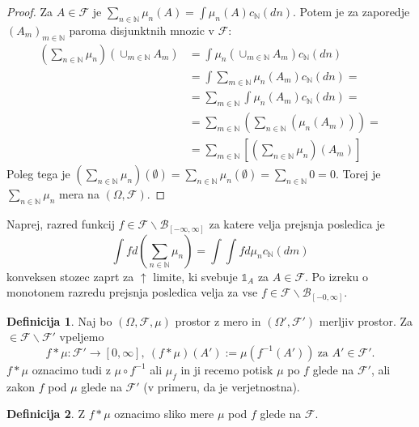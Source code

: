 \documentclass[a4paper,12pt]{article}
\theoremstyle{definition} %
\newtheorem{definicija}{Definicija}[section]
\theoremstyle{plain} %
\newcommand{\N}{\mathbb{N}}
\newcommand{\F}{\mathcal{F}}
\begin{document}
            \begin{proof}
                Za $A \in \F$ je $\sum_{n \in \N}\mu_n(A) = \int \mu_n(A)c_\N(dn)$. Potem je za zaporedje $(A_m)_{m \in \N}$
                paroma disjunktnih mnozic v $\F$:
                \begin{align*}
                    \left( \sum_{n \in \N}\mu_n \right)\left(\cup_{m \in \N}A_m\right) &= \int \mu_n \left(\cup_{m \in \N}A_m\right)c_\N(dn) \\
                    &= \int \sum_{m \in \N}\mu_n(A_m)c_\N(dn) = \\
                    &= \sum_{m \in \N} \int \mu_n(A_m)c_\N(dn) = \\
                    &= \sum_{m \in \N}\left(\sum_{n\in \N}(\mu_n(A_m))\right) = \\
                    &= \sum_{m \in \N}\left[\left(\sum_{n\in\N}\mu_n\right)(A_m)\right]                    
                \end{align*}
                Poleg tega je
                $\left(\sum_{n\in\N}\mu_n\right)(\emptyset) = \sum_{n\in\N}\mu_n(\emptyset) = \sum_{n\in\N}0 = 0.$
                Torej je $\sum_{n\in\N}\mu_n$ mera na $(\Omega, \F)$.
            \end{proof}

            Naprej, razred funkcij $f \in \F\backslash\mathcal{B}_{[-\infty, \infty]}$ za katere velja prejsnja posledica je
            $$
                \int f d\left(\sum_{n\in\N}\mu_n\right) = \int \int f d\mu_n c_\N(dm)
            $$
            konveksen stozec zaprt za $\uparrow$ limite, ki svebuje $\mathds{1}_A$ za $A \in \F$.
            Po izreku o monotonem razredu prejsnja posledica velja za vse $f \in \F\backslash\mathcal{B}_{[-0, \infty]}$.

            \begin{definicija}
                Naj bo $(\Omega, \F, \mu)$ prostor z mero in $(\Omega', \F')$ merljiv prostor. Za $ \in \F\backslash\F'$ vpeljemo
                $$
                    f * \mu: \F' \rightarrow [0, \infty], \
                    (f*\mu)(A') := \mu(f^{-1}(A')) \ \text{za $A'\in \F'$}.
                $$
                $f*\mu$ oznacimo tudi z $\mu \circ f^{-1}$ ali $\mu_{f}$ in ji recemo potisk $\mu$ po $f$ glede na $\F'$, ali 
                zakon $f$ pod $\mu$ glede na $\F'$ (v primeru, da je verjetnostna).
            \end{definicija}

            \begin{definicija}
                Z $f*\mu$ oznacimo sliko mere $\mu$ pod $f$ glede na $\F$.
            \end{definicija}
\end{document}
